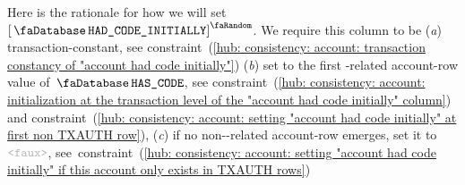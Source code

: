 \saNote{}\label{hub: consistency: account: rationale for "account had code initially"}
Here is the rationale for how we will set $\order{\accHadCodeInitially}$.
We require this column to be
(\emph{a}) transaction-constant,
           see constraint~(\ref{hub: consistency: account: transaction constancy of "account had code initially"})
(\emph{b}) set to the first \txAuth{}-related account-row value of $\accHasCode$,
           see constraint~(\ref{hub: consistency: account: initialization at the transaction level of the "account had code initially" column}) and constraint~(\ref{hub: consistency: account: setting "account had code initially" at first non TXAUTH row}),
(\emph{c}) if no non-\txAuth{}-related account-row emerges, set it to $\false$,
           see~constraint~(\ref{hub: consistency: account: setting "account had code initially" if this account only exists in TXAUTH rows})
